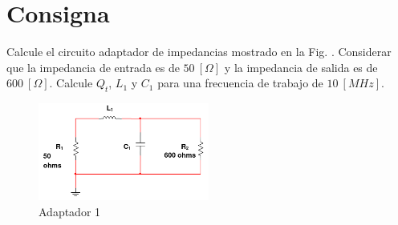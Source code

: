 \section{Consigna}

Calcule el circuito adaptador de impedancias mostrado en la Fig. . Considerar que la impedancia de entrada es de $50 \: [\Omega]$ y la impedancia de salida es de $600 \: [\Omega]$. Calcule $Q_{t}$, $L_{1}$ y $C_{1}$ para una frecuencia de trabajo de $10 \: [MHz]$.

\begin{figure}
  \centering
  \includegraphics[width=0.5\textwidth]{../images/eje1_circuito.png}
  \caption{Adaptador 1}
  \label{fig:eje1_circuito}

\end{figure}
